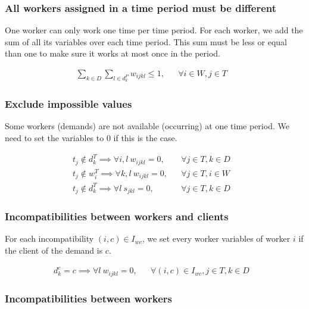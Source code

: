 \documentclass[../../thesis.tex]{subfiles}
\begin{document}
\subsubsection{All workers assigned in a time period must be different}

One worker can only work one time per time period. For each worker, we add the sum of all its variables 
over each time period. This sum must be less or equal than one to make sure it works at most once in the period.

\begin{align}
  \sum_{k \in D} \sum_{l \in d_k^P} w_{ijkl} \leq 1, && \forall i \in W, j \in T & \label{wc2} 
\end{align}


\subsubsection{Exclude impossible values}

Some workers (demands) are not available (occurring) at one time period. We need to set the variables to 0 if this is the case.

\begin{align}
  t_j \notin d^T_{k} \implies \forall i, l \ w_{ijkl} = 0,  && \forall j \in T , k \in D &\label{wc3} \\
  t_j \notin w^T_{i} \implies \forall k, l \ w_{ijkl} = 0, && \forall j \in T, i \in W &\label{wc4} \\
  t_j \notin d^T_{k} \implies \forall l \ s_{jkl} = 0,  && \forall j \in T , k \in D &\label{sc1} 
\end{align}

\subsubsection{Incompatibilities between workers and clients}

For each incompatibility $(i, c) \in I_{wc}$, we set every worker variables of worker $i$ if the client of the 
demand is $c$.

\begin{align}
  d^c_{k} = c \implies \forall l \ w_{ijkl} = 0, && \forall {(i, c) \in I_{wc}}, j \in T, k \in D &\label{wc6}
\end{align}

\subsubsection{Incompatibilities between workers}
\end{document}
